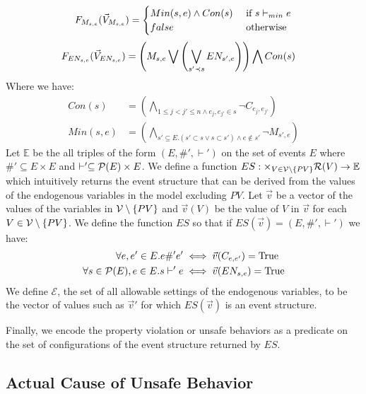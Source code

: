 $$
    F_{M_{s,e}}(\vec V_{M_{s,e}}) = \begin{cases}
        Min(s,e) \wedge Con(s) & \text{ if } s \vdash_{min} e \\
        false                  & \text{ otherwise }
    \end{cases}
$$
\begin{align*}
    F_{EN_{s,e}}(\vec V_{EN_{s,e}}) & =
    \left(
    M_{s,e} \bigvee
    \left(
    \bigvee_{s'\prec s}EN_{s',e}
    \right)
    \right)
    \bigwedge
    Con(s)
\end{align*}
Where we have:
\begin{align*}
    Con(s)   & =   \left(
    \bigwedge_{ 1\leq j<j' \leq n \wedge e_j,e_{j'} \in s}
    \neg C_{e_j,e_{j'}}
    \right)               \\
    Min(s,e) & = \left(
    \bigwedge_{s' \subseteq E. (s' \subset s \vee s \subset s')
        \wedge e \notin s'}
    \neg M_{s',e}
    \right)
\end{align*}
Let $\mathbb{E}$ be the all triples of the form
$(E,\#',\vdash')$ on the set of events $E$ where
$\#' \subseteq E \times E$ and
$\vdash' \subseteq \mathcal{P}(E) \times E$.
We define a function
$ES: \times_{V \in \mathcal{V}\setminus \{PV\}} \mathcal{R}(V) \rightarrow \mathbb{E}$ which intuitively returns the event structure
that can be derived from the values of the endogenous variables
in the model excluding $PV$.
Let $\vec v$ be a vector of the values of the variables
in $\mathcal{V} \setminus \{PV\}$ and $\vec v(V)$ be the value of
 $V$ in $\vec v$ for each $V \in \mathcal{V} \setminus \{PV\}$.
We define the function $ES$ so that if
$ES(\vec v) = (E,\#',\vdash')$ we have:
\begin{align*}
    \forall e,e' \in E. e \#' e' & \iff \vec{v}(C_{e,e'}) = \mathrm{True} \\
    \forall s \in \mathcal{P}(E), e \in E.  s \vdash' e
     & \iff \vec{v}(EN_{s,e}) = \mathrm{True}
\end{align*}
We define $\mathcal{E}$, the set of all allowable
settings of the endogenous variables, to be the vector of
values such as $\vec v'$ for which $ES(\vec v)$ is an
event structure.

Finally, we encode the property violation or unsafe behaviors
as a predicate on the set of configurations of the
event structure returned by $ES$.

\subsection{Actual Cause of Unsafe Behavior}

